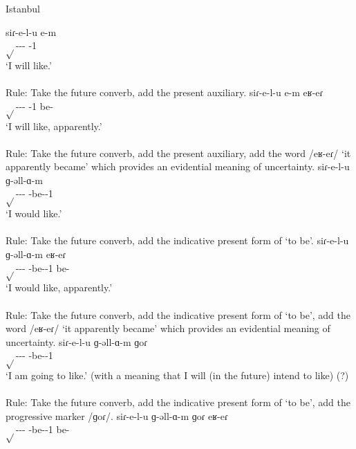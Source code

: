 \begin{exe}
	\ex Istanbul \label{sent:Istanbul:morpho:verb:complex:futcvb:pres}
	\begin{xlist}
		\ex \gll siɾ-e-l-u e-m \\
		$\sqrt{}$-{\thgloss}-{\infgloss}-{\futcvb} {\aux}-1{\sg} \\
		\trans `I will like.' \\
		 \\
		Rule: Take the future converb, add the present auxiliary.
		\ex \gll siɾ-e-l-u e-m eʁ-eɾ \\
		$\sqrt{}$-{\thgloss}-{\infgloss}-{\futcvb} {\aux}-1{\sg} be-{\eptcp} \\
		\trans `I will like, apparently.' \\
		 \\
		Rule: Take the future converb, add the present auxiliary, add the word /eʁ-eɾ/ `it apparently became' which provides an evidential meaning of uncertainty.
		\ex \gll siɾ-e-l-u ɡ-əll-ɑ-m \\
		$\sqrt{}$-{\thgloss}-{\infgloss}-{\futcvb} {\ind}-be-{\thgloss}-1{\sg} \\
		\trans `I would like.' \\
		 \\
		Rule: Take the future converb, add the indicative present form of `to be'.
		\ex \gll siɾ-e-l-u ɡ-əll-ɑ-m eʁ-eɾ \\
		$\sqrt{}$-{\thgloss}-{\infgloss}-{\futcvb} {\ind}-be-{\thgloss}-1{\sg} be-{\eptcp} \\
		\trans `I would like, apparently.' \\
		 \\
		Rule: Take the future converb, add the indicative present form of `to be', add the word /eʁ-eɾ/ `it apparently became' which provides an evidential meaning of uncertainty.
		\ex \gll siɾ-e-l-u ɡ-əll-ɑ-m ɡoɾ \\
		$\sqrt{}$-{\thgloss}-{\infgloss}-{\futcvb} {\ind}-be-{\thgloss}-1{\sg} {\prog} \\
		\trans `I am going to like.' (with a meaning that I will (in the future) intend to like) (?) \\
		 \\
		Rule: Take the future converb, add the indicative present form of `to be', add the progressive marker /ɡoɾ/. 
		\ex \gll siɾ-e-l-u ɡ-əll-ɑ-m ɡoɾ eʁ-eɾ \\
		$\sqrt{}$-{\thgloss}-{\infgloss}-{\futcvb} {\ind}-be-{\thgloss}-1{\sg} {\prog} be-{\eptcp} \\

\end{xlist}
\end{exe}
